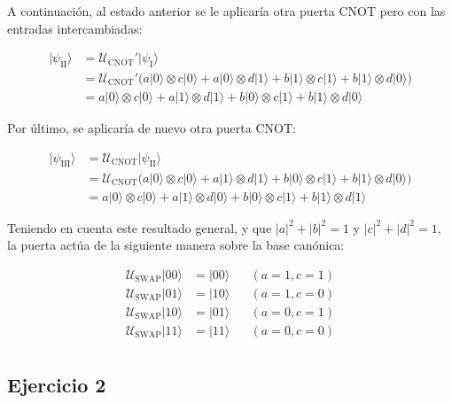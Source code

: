 \documentclass{article}
\begin{document}
A continuación, al estado anterior se le aplicaría otra puerta CNOT
pero con las entradas intercambiadas:

\begin{align*}
  |\psi_\text{II}\rangle
    &=\mathcal{U}_\text{CNOT}'|\psi_\text{I}\rangle \\
    &= \mathcal{U}_\text{CNOT}'\Big(
        a|0\rangle \otimes c|0\rangle
        + a|0\rangle \otimes d|1\rangle 
        + b|1\rangle \otimes c|1\rangle 
        + b|1\rangle \otimes d|0\rangle
      \Big) \\
    &= a|0\rangle \otimes c|0\rangle
        + a|1\rangle \otimes d|1\rangle 
        + b|0\rangle \otimes c|1\rangle 
        + b|1\rangle \otimes d|0\rangle
\end{align*}

Por último, se aplicaría de nuevo otra puerta CNOT:

\begin{align*}
  |\psi_\text{III}\rangle
    &=\mathcal{U}_\text{CNOT}|\psi_\text{II}\rangle \\
    &= \mathcal{U}_\text{CNOT}\Big(
        a|0\rangle \otimes c|0\rangle
        + a|1\rangle \otimes d|1\rangle 
        + b|0\rangle \otimes c|1\rangle 
        + b|1\rangle \otimes d|0\rangle
      \Big) \\
    &= a|0\rangle \otimes c|0\rangle
        + a|1\rangle \otimes d|0\rangle 
        + b|0\rangle \otimes c|1\rangle 
        + b|1\rangle \otimes d|1\rangle
\end{align*}

Teniendo en cuenta este resultado general, y que $|a|^2 + |b|^2 = 1$
y $|c|^2 + |d|^2 = 1$, la puerta actúa de la siguiente manera sobre
la base canónica:

\begin{align*}
  \mathcal{U}_\text{SWAP}|00\rangle &= |00\rangle 
    \;\;\;\;\;\;(a = 1, c = 1)\\
  \mathcal{U}_\text{SWAP}|01\rangle &= |10\rangle 
    \;\;\;\;\;\;(a = 1, c = 0)\\
  \mathcal{U}_\text{SWAP}|10\rangle &= |01\rangle 
    \;\;\;\;\;\;(a = 0, c = 1)\\
  \mathcal{U}_\text{SWAP}|11\rangle &= |11\rangle
    \;\;\;\;\;\;(a = 0, c = 0)\\
\end{align*}

\subsection*{Ejercicio 2}
\end{document}
